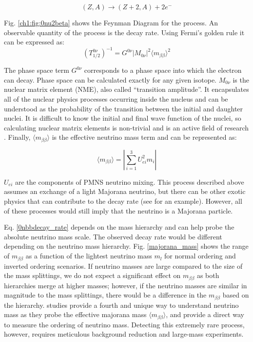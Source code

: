 \begin{equation}\label{0nbeta_decay_eq}
(Z,A) \rightarrow (Z+2,A) + 2e^-
\end{equation}




Fig. \ref{ch1:fig:0nu2beta} shows the Feynman Diagram for the process. An observable quantity of the process is the decay rate. Using Fermi's golden rule it can be expressed as:
\begin{equation}\label{0nbbdecay_rate}
(T^{0\nu}_{1/2})^{-1} = G^{0\nu}\left|M_{0\nu}\right|^2\langle m_{\beta\beta}\rangle^2
\end{equation}

The phase space term $G^{0\nu}$ corresponds to a phase space into which the electron can decay. Phase space can be calculated exactly for any given isotope. $M_{0\nu}$ is the nuclear matrix element (NME), also called ``transition amplitude''. It encapsulates all of the nuclear physics processes occurring inside the nucleus and can be understood as the probability of the transition between the initial and daughter nuclei. It is difficult to know the initial and final wave function of the nuclei, so calculating nuclear matrix elements is non-trivial and is an active field of research \cite{Menendez:2017fdf}. Finally, $\langle m_{\beta\beta}\rangle$ is the effective neutrino mass term and can be represented as:

\begin{equation}\label{effective_mjd_mass}
\langle m_{\beta\beta}\rangle =  \left|\sum_{i=1}^{3} U^2_{ei}m_i\right|
\end{equation}

$U_{ei}$ are the components of PMNS neutrino mixing. This process described above assumes an exchange of a light Majorana neutrino, but there can be other exotic physics that can contribute to the decay rate (see \cite{Schechter_1982} for an example). However, all of these processes would still imply that the neutrino is a Majorana particle.

Eq. \ref{0nbbdecay_rate} depends on the mass hierarchy and can help probe the absolute neutrino mass scale. The observed decay rate would be different depending on the neutrino mass hierarchy. Fig. \ref{majorana_mass} shows the range of $m_{\beta\beta}$ as a function of the lightest neutrino mass $m_l$ for normal ordering and inverted ordering scenarios. If neutrino masses are large compared to the size of the mass splittings, we do not expect a significant effect on $m_{\beta\beta}$ as both hierarchies merge at higher masses; however, if the neutrino masses are similar in magnitude to the mass splittings, there would be a difference in the $m_{\beta\beta}$ based on the hierarchy. {\onbb} studies provide a fourth and unique way to understand neutrino mass as they probe the effective majorana mass $\langle m_{\beta\beta}\rangle$, and provide a direct way to measure the ordering of neutrino mass. Detecting this extremely rare process, however, requires meticulous background reduction and large-mass experiments.

